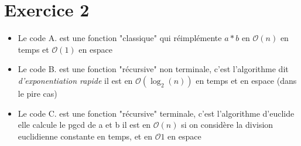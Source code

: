 \documentclass{article}
\begin{document}
    \section{Exercice 2}
    \begin{itemize}
        \item Le code A. est une fonction "classique" qui réimplémente $a*b$ en $\mathcal{O}(n)$ en temps et $\mathcal{O}(1)$ en espace
        \item Le code B. est une fonction "récursive" non terminale, c'est l'algorithme dit \textit{d'exponentiation rapide} 
        il est en $\mathcal{O}(\log_2(n))$ en temps et en espace (dans le pire cas)
        \item Le code C. est une fonction "récursive" terminale, c'est l'algorithme d'euclide elle calcule le pgcd de a et b 
        il est en $\mathcal{O}(n)$ si on considère la division euclidienne constante en temps, et en $\mathcal{O}{1}$ en espace
    \end{itemize}
\end{document}

